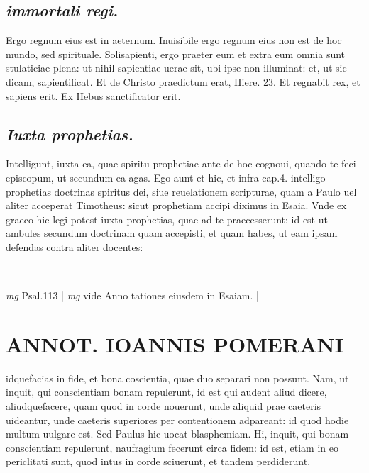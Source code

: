 \documentclass{article}
\begin{document}
\begin{pages}
\subsection*{\textit{immortali regi. }}\pstart Ergo regnum eius est in aeternum. Inuisibile ergo regnum eius non est de hoc mundo, sed spirituale. Solisapienti, ergo praeter eum et extra eum omnia sunt stulaticiae plena: ut nihil sapientiae uerae sit, ubi ipse non illuminat: et, ut sic dicam, sapientificat. Et de Christo praedictum erat, Hiere. 23. Et regnabit rex, et sapiens erit. Ex Hebus  sanctificator erit.  \pend
{}
{}
\subsection*{\textit{Iuxta prophetias. }}\pstart Intelligunt, iuxta ea, quae spiritu prophetiae ante de hoc cognoui, quando te feci episcopum, ut secundum ea agas. Ego aunt et hic, et infra cap.4. intelligo prophetias doctrinas spiritus dei, siue reuelationem scripturae, quam a Paulo uel aliter acceperat Timotheus: sicut prophetiam accipi diximus in Esaia. Vnde ex graeco hic legi potest iuxta prophetias, quae ad te praecesserunt: id est ut ambules secundum doctrinam quam accepisti, et quam habes, ut eam ipsam defendas contra aliter docentes:  \pend
\vspace{0.5cm}\noindent
\vspace{0.2cm}\rule{1cm}{0.2pt}\\ 
\hspace{0.2cm}\textit{mg}
\footnotesize Psal.113 
\normalsize| 
\hspace{0.2cm}\textit{mg}
\footnotesize vide Anno tationes eiusdem in Esaiam. 
\normalsize| 
\section*{ANNOT. IOANNIS POMERANI }\pstart idquefacias in fide, et bona coscientia, quae duo separari non possunt. Nam, ut inquit, qui conscientiam bonam repulerunt, id est qui audent aliud dicere, aliudquefacere, quam quod in corde nouerunt, unde aliquid prae caeteris uideantur, unde caeteris superiores per contentionem adpareant: id quod hodie multum uulgare est. Sed Paulus hic uocat blasphemiam. Hi, inquit, qui bonam conscientiam repulerunt, naufragium fecerunt circa fidem: id est, etiam in eo periclitati sunt, quod intus in corde sciuerunt, et tandem perdiderunt.  \pend
{}
{}

\end{pages}
\end{document}
